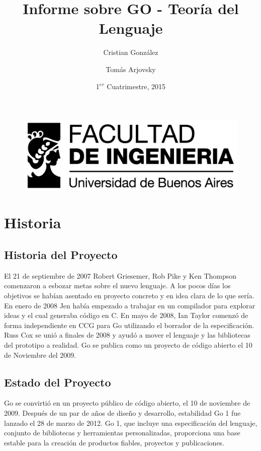 \documentclass{article}
\begin{document}
\begin{figure}
	\centering
	\includegraphics[width=0.9\linewidth]{./logo_fiuba_alta}
	\label{fig:logo_fiuba_alta}
\end{figure}

\title{Informe sobre GO - Teoría del Lenguaje}
\author{Cristian González \and Tomás Arjovsky}
\date{1$^{er}$ Cuatrimestre, 2015}
\maketitle
\newpage
\tableofcontents
\newpage
\section{Historia}
\subsection{Historia del Proyecto}
El 21 de septiembre de 2007 Robert Griesemer, Rob Pike y Ken Thompson comenzaron a esbozar metas sobre el nuevo lenguaje. A los pocos días los objetivos se habían asentado en proyecto concreto y en idea clara de lo que sería. En enero de 2008 Jen había empezado a trabajar en un compilador para explorar ideas y el cual generaba código en C.
En mayo de 2008, Ian Taylor comenzó de forma independiente en CCG para Go utilizando el borrador de la especificación. Russ Cox se unió a finales de 2008 y ayudó a mover el lenguaje y las bibliotecas del prototipo a realidad.
Go se publica como un proyecto de código abierto el 10 de Noviembre del 2009. 

\subsection{Estado del Proyecto}

Go se convirtió en un proyecto público de código abierto, el 10 de noviembre de 2009. Después de un par de años de diseño y desarrollo, estabilidad Go 1 fue lanzado el 28 de marzo de 2012. Go 1, que incluye una especificación del lenguaje, conjunto de bibliotecas y herramientas personalizadas, proporciona una base estable para la creación de productos fiables, proyectos y publicaciones. 
\end{document}
